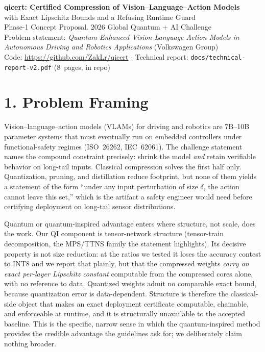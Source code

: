 \documentclass[10pt]{article}
\begin{document}
\begin{center}
{\LARGE\bfseries qicert: Certified Compression of Vision--Language--Action Models}\\[2pt]
{\large with Exact Lipschitz Bounds and a Refusing Runtime Guard}\\[6pt]
Phase-1 Concept Proposal. 2026 Global Quantum + AI Challenge\\
Problem statement: \emph{Quantum-Enhanced Vision-Language-Action Models in
Autonomous Driving and Robotics Applications} (Volkswagen Group)\\
Code: \url{https://github.com/ZakLr/qicert} \quad$\cdot$\quad
Technical report: \texttt{docs/technical-report-v2.pdf} (8~pages, in repo)
\end{center}

\section*{1. Problem Framing}
Vision--language--action models (VLAMs) for driving and robotics are 7B--10B
parameter systems that must eventually run on embedded controllers under
functional-safety regimes (ISO~26262, IEC~62061). The challenge statement
names the compound constraint precisely: shrink the model \emph{and} retain
verifiable behavior on long-tail inputs. Classical compression solves the
first half only. Quantization, pruning, and distillation reduce footprint, but
none of them yields a statement of the form ``under any input perturbation of
size $\delta$, the action cannot leave this set,'' which is the artifact a
safety engineer would need before certifying deployment on long-tail sensor
distributions.

Quantum or quantum-inspired advantage enters where structure, not scale, does
the work. Our QI component is tensor-network structure (tensor-train
decomposition, the MPS/TTNS family the statement highlights). Its decisive
property is not size reduction: at the ratios we tested it loses the
accuracy contest to INT8 and we report that plainly, but that the
compressed weights \emph{carry an exact per-layer Lipschitz constant}
computable from the compressed cores alone, with no reference to data.
Quantized weights admit no comparable exact bound, because quantization error
is data-dependent. Structure is therefore the classical-side object that makes
an exact deployment certificate computable, chainable, and enforceable at
runtime, and it is structurally unavailable to the accepted baseline. This
is the specific, narrow sense in which the quantum-inspired method provides
the credible advantage the guidelines ask for; we deliberately claim nothing
broader.
\end{document}
